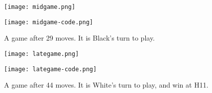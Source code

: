 \documentclass[12pt,a4paper,notitlepage]{article}
\begin{document}
\begin{figure}[bhtp]
	\begin{minipage}{0.45\textwidth}
		\texttt{[image: midgame.png]}
	\end{minipage}
	\begin{minipage}{0.55\textwidth}
		\texttt{[image: midgame-code.png]}
	\end{minipage}
	\caption{A game after 29 moves. It is Black's turn to play.\label{fig:midgame}}
\end{figure}

\begin{figure}[bhtp]
	\begin{minipage}{0.45\textwidth}
		\texttt{[image: lategame.png]}
	\end{minipage}
	\begin{minipage}{0.55\textwidth}
		\texttt{[image: lategame-code.png]}
	\end{minipage}
	\caption{A game after 44 moves. It is White's turn to play, and win at H11.\label{fig:lategame}}
\end{figure}

\printbibliography
\end{document}
